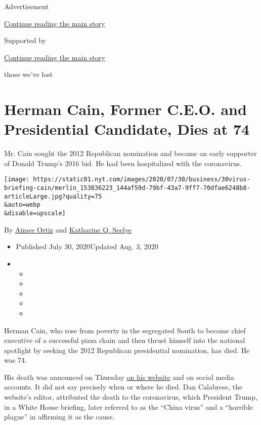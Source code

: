Advertisement

\protect\hyperlink{after-top}{Continue reading the main story}

Supported by

\protect\hyperlink{after-sponsor}{Continue reading the main story}

those we've lost

\hypertarget{herman-cain-former-ceo-and-presidential-candidate-dies-at-74}{%
\section{Herman Cain, Former C.E.O. and Presidential Candidate, Dies at
74}\label{herman-cain-former-ceo-and-presidential-candidate-dies-at-74}}

Mr. Cain sought the 2012 Republican nomination and became an early
supporter of Donald Trump's 2016 bid. He had been hospitalized with the
coronavirus.

\texttt{[image: https://static01.nyt.com/images/2020/07/30/business/30virus-briefing-cain/merlin\_153836223\_144af59d-79bf-43a7-9ff7-70dfae6248b8-articleLarge.jpg?quality=75\\\&auto=webp\\\&disable=upscale]}

By \href{https://www.nytimes.com/by/aimee-ortiz}{Aimee Ortiz} and
\href{https://www.nytimes.com/by/katharine-q-seelye}{Katharine Q.
Seelye}

\begin{itemize}
\item
  Published July 30, 2020Updated Aug. 3, 2020
\item
  \begin{itemize}
  \item
  \item
  \item
  \item
  \item
  \end{itemize}
\end{itemize}

Herman Cain, who rose from poverty in the segregated South to become
chief executive of a successful pizza chain and then thrust himself into
the national spotlight by seeking the 2012 Republican presidential
nomination, has died. He was 74.

His death was announced on Thursday
\href{https://hermancain.com/heartbroken-world-poorer-herman-cain-gone-lord/?utm_source=twitter\&utm_medium=thenewvoice\&utm_content=2020-07-30}{on
his website} and on social media accounts. It did not say precisely when
or where he died. Dan Calabrese, the website's editor, attributed the
death to the coronavirus, which President Trump, in a White House
briefing, later referred to as the ``China virus'' and a ``horrible
plague'' in affirming it as the cause.

